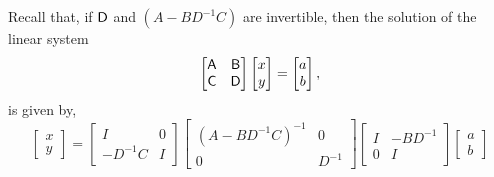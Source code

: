 Recall that, if $\mathsf{D}$ and $\left( A-BD^{-1}C \right) $ are invertible,  
then the solution of the linear system 
\begin{equation*}
\begin{bmatrix}
\mathsf{A}  & \mathsf{B} \\
\mathsf{C}  & \mathsf{D} 
\end{bmatrix} 
\begin{bmatrix}
x \\ y
\end{bmatrix}
= 
\begin{bmatrix}
a \\ b
\end{bmatrix}, 
\end{equation*}
is given by, 
\begin{equation}\label{eq:schur_inv}
\begin{bmatrix}
x \\ y
\end{bmatrix}=
\begin{bmatrix}
I  & 0 \\
-D^{-1}C  & I 
\end{bmatrix}
 \begin{bmatrix}
\left( A-BD^{-1}C \right)^{-1}   &  0 \\
 0   & D^{-1} 
\end{bmatrix}
\begin{bmatrix}
I  &   -BD^{-1} \\
0  &  I 
\end{bmatrix}
\begin{bmatrix}
a \\ b
\end{bmatrix}
\end{equation}


